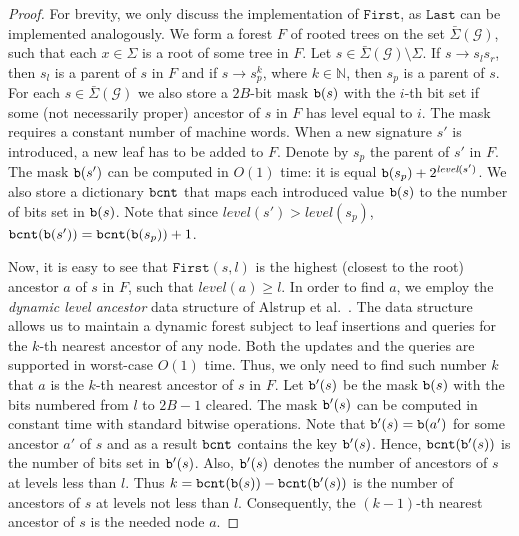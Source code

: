\documentclass[a4paper]{article}
\theoremstyle{remark}
\newcommand{\sigs}{\bar{\Sigma}}
\newcommand{\grammar}{\mathcal{G}}
\newcommand{\mword}{B}
\newcommand{\slev}{\textit{level}}
\newcommand{\itfirst}{\mathtt{First}}
\newcommand{\itlast}{\mathtt{Last}}
\begin{document}
\begin{proof}
For brevity, we only discuss the implementation of $\itfirst$, as $\itlast$ can
be implemented analogously.
We form a forest $F$ of rooted trees on the set $\sigs(\grammar)$, such that each
$x\in\Sigma$ is a root of some tree in $F$.
Let $s\in\sigs(\grammar)\setminus\Sigma$.
If $s\to s_l s_r$, then $s_l$ is a parent of $s$ in $F$ and
if $s\to s_p^k$, where $k\in\mathbb{N}$, then $s_p$ is
a parent of $s$.
For each $s\in\sigs(\grammar)$ we also store a $2\mword$-bit mask $\mathtt{b}(s)$ with
the $i$-th bit set if some (not necessarily proper) ancestor of $s$ in $F$ has
level equal to $i$.
The mask requires a constant number of machine words.
When a new signature $s'$ is introduced, a new leaf has to be added
to $F$.
Denote by $s_p$ the parent of $s'$ in $F$.
The mask $\mathtt{b}(s')$ can be computed in $O(1)$ time: it is equal
$\bmask(s_p)+2^{\slev(s')}$.
We also store a dictionary $\mathtt{bcnt}$ that maps each introduced value $\mathtt{b}(s)$
to the number of bits set in $\mathtt{b}(s)$.
Note that since $\slev(s')>\slev(s_p)$, $\mathtt{bcnt}(\mathtt{b}(s'))=\mathtt{bcnt}(\mathtt{b}(s_p))+1$.

Now, it is easy to see that $\itfirst(s,l)$ is the highest (closest to the root)
ancestor $a$ of $s$ in $F$, such that $\slev(a)\geq l$.
In order to find $a$, we employ the \emph{dynamic level ancestor}
data structure of Alstrup et al.~\cite{Alstrup:2000}.
The data structure allows us to maintain a dynamic forest subject
to leaf insertions and queries for the $k$-th nearest ancestor
of any node.
Both the updates and the queries are supported in worst-case $O(1)$ time.
Thus, we only need to find such number $k$ that $a$ is
the $k$-th nearest ancestor of $s$ in $F$.
Let $\mathtt{b}'(s)$ be the mask $\mathtt{b}(s)$ with the bits numbered from $l$ to $2\mword-1$
cleared.
The mask $\mathtt{b}'(s)$ can be computed in constant time with standard bitwise operations.
Note that $\mathtt{b}'(s)=\mathtt{b}(a')$ for some ancestor $a'$ of $s$
and as a result $\mathtt{bcnt}$ contains the key $\mathtt{b}'(s)$.
Hence, $\mathtt{bcnt}(\mathtt{b}'(s))$ is the number of bits set in $\mathtt{b}'(s)$.
Also, $\mathtt{b}'(s)$ denotes the number of ancestors of $s$ at levels less than $l$.
Thus $k=\mathtt{bcnt}(\mathtt{b}(s))-\mathtt{bcnt}(\mathtt{b}'(s))$ is the number of ancestors
of $s$ at levels not less than $l$.
Consequently, the $(k-1)$-th nearest ancestor of $s$ is the needed node $a$.
\end{proof}
\end{document}
